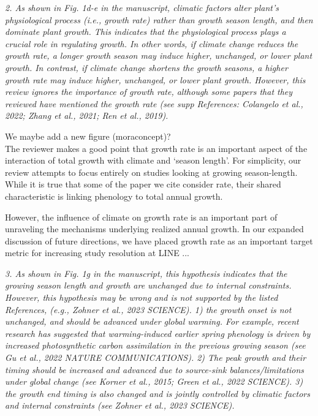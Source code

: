\documentclass[11pt]{article}
\begin{document}
\emph{2. As shown in Fig. 1d-e in the manuscript, climatic factors alter plant’s physiological process (i.e., growth rate) rather than growth season length, and then dominate plant growth. This indicates that the physiological process plays a crucial role in regulating growth. In other words, if climate change reduces the growth rate, a longer growth season may induce higher, unchanged, or lower plant growth. In contrast, if climate change shortens the growth seasons, a higher growth rate may induce higher, unchanged, or lower plant growth. However, this review ignores the importance of growth rate, although some papers that they reviewed have mentioned the growth rate (see supp References: Colangelo et al., 2022; Zhang et al., 2021; Ren et al., 2019).}

We maybe add a new figure (moraconcept)? \\

The reviewer makes a good point that growth rate is an important aspect of the interaction of total growth with climate and ‘season length’. For simplicity, our review attempts to focus entirely on studies looking at growing season-length. While it is true that some of the paper we cite consider rate, their shared characteristic is linking phenology to total annual growth. 

However, the influence of climate on growth rate is an important part of unraveling the mechanisms underlying realized annual growth. In our expanded discussion of future directions, we have placed growth rate as an important target metric for increasing study resolution at LINE ...%


\emph{3. As shown in Fig. 1g in the manuscript, this hypothesis indicates that the growing season length and growth are unchanged due to internal constraints. However, this hypothesis may be wrong and is not supported by the listed References, (e.g., Zohner et al., 2023 SCIENCE). 1) the growth onset is not unchanged, and should be advanced under global warming. For example, recent research has suggested that warming-induced earlier spring phenology is driven by increased photosynthetic carbon assimilation in the previous growing season (see Gu et al., 2022 NATURE COMMUNICATIONS). 2) The peak growth and their timing should be increased and advanced due to source-sink balances/limitations under global change (see Korner et al., 2015; Green et al., 2022 SCIENCE). 3) the growth end timing is also changed and is jointly controlled by climatic factors and internal constraints (see Zohner et al., 2023 SCIENCE).}
\end{document}
